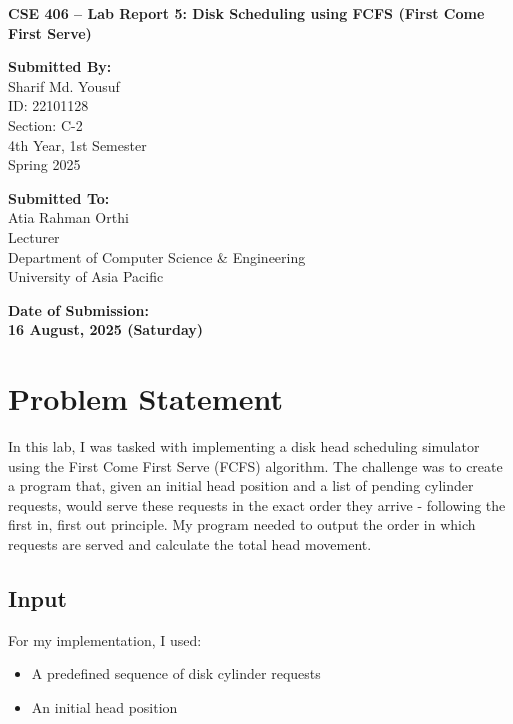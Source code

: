 \documentclass[12pt,a4paper]{article}
\begin{document}
\begin{titlepage}
  \centering
  \vspace*{3cm}

  {\Huge\bfseries CSE 406 – Lab Report 5: Disk Scheduling using FCFS (First Come First Serve) \par}
  \vspace{2.5cm}

  \noindent
  \begin{minipage}[t]{0.48\textwidth}
    {\large\bfseries Submitted By:}\\[0.5em]
    \Large
    Sharif Md. Yousuf \\
    ID: 22101128 \\
    Section: C-2 \\
    4th Year, 1st Semester \\
    Spring 2025
  \end{minipage}
  \hfill
  \begin{minipage}[t]{0.48\textwidth}
    {\large\bfseries Submitted To:}\\[0.5em]
    \Large
    Atia Rahman Orthi \\
    Lecturer \\
    Department of Computer Science \& Engineering \\
    University of Asia Pacific
  \end{minipage}

  \vfill

  {\Large\bfseries Date of Submission:} \\[0.5em]
  {\LARGE\bfseries 16 August, 2025 (Saturday)}

  \vspace*{2cm}
\end{titlepage}

\section{Problem Statement}
In this lab, I was tasked with implementing a disk head scheduling simulator using the First Come First Serve (FCFS) algorithm. The challenge was to create a program that, given an initial head position and a list of pending cylinder requests, would serve these requests in the exact order they arrive - following the first in, first out principle. My program needed to output the order in which requests are served and calculate the total head movement.

\subsection*{Input}
For my implementation, I used:
\begin{itemize}
  \item A predefined sequence of disk cylinder requests
  \item An initial head position
\end{itemize}
\end{document}
